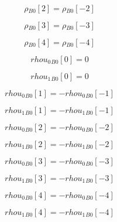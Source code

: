 \documentclass{article}
\begin{document}
\begin{dmath}{\rho{_{B0}}}[{2}] = {\rho{_{B0}}}[{-2}]\end{dmath}

\begin{dmath}{\rho{_{B0}}}[{3}] = {\rho{_{B0}}}[{-3}]\end{dmath}

\begin{dmath}{\rho{_{B0}}}[{4}] = {\rho{_{B0}}}[{-4}]\end{dmath}

\begin{dmath}{rhou_{0}{_{B0}}}[{0}] = 0\end{dmath}

\begin{dmath}{rhou_{1}{_{B0}}}[{0}] = 0\end{dmath}

\begin{dmath}{rhou_{0}{_{B0}}}[{1}] = - {rhou_{0}{_{B0}}}[{-1}]\end{dmath}

\begin{dmath}{rhou_{1}{_{B0}}}[{1}] = - {rhou_{1}{_{B0}}}[{-1}]\end{dmath}

\begin{dmath}{rhou_{0}{_{B0}}}[{2}] = - {rhou_{0}{_{B0}}}[{-2}]\end{dmath}

\begin{dmath}{rhou_{1}{_{B0}}}[{2}] = - {rhou_{1}{_{B0}}}[{-2}]\end{dmath}

\begin{dmath}{rhou_{0}{_{B0}}}[{3}] = - {rhou_{0}{_{B0}}}[{-3}]\end{dmath}

\begin{dmath}{rhou_{1}{_{B0}}}[{3}] = - {rhou_{1}{_{B0}}}[{-3}]\end{dmath}

\begin{dmath}{rhou_{0}{_{B0}}}[{4}] = - {rhou_{0}{_{B0}}}[{-4}]\end{dmath}

\begin{dmath}{rhou_{1}{_{B0}}}[{4}] = - {rhou_{1}{_{B0}}}[{-4}]\end{dmath}
\end{document}
